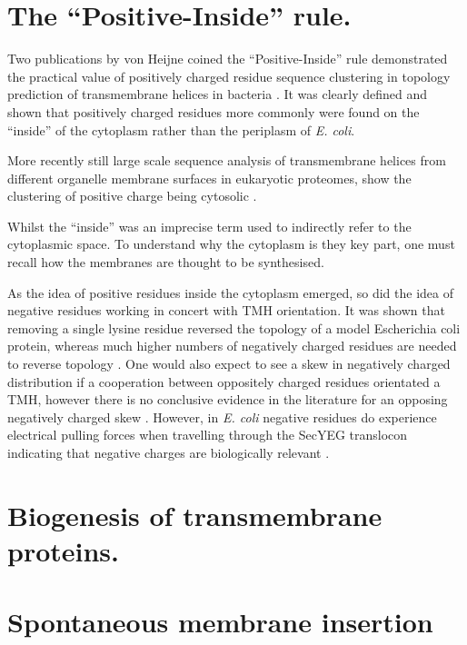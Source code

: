 \documentclass[12pt,PhD,twoside]{muthesis}
\begin{document}
\section{The ``Positive-Inside'' rule.}

Two publications by von Heijne coined the ``Positive-Inside'' rule demonstrated the practical value of positively charged residue sequence clustering in topology prediction of transmembrane helices in bacteria \cite{VonHeijne1989,VonHeijne1992}. It was clearly defined and shown that positively charged residues more commonly were found on the ``inside'' of the cytoplasm rather than the periplasm of {\it E. coli}.

More recently still large scale sequence analysis of transmembrane helices from different organelle membrane surfaces in eukaryotic proteomes, show the clustering of positive charge being cytosolic \cite{Sharpe2010, Baeza-Delgado2013}.

Whilst the ``inside'' was an imprecise term used to indirectly refer to the cytoplasmic space. To understand why the cytoplasm is they key part, one must recall how the membranes are thought to be synthesised.


As the idea of positive residues inside the cytoplasm emerged, so did the idea of negative residues working in concert with TMH orientation. It was shown that removing a single lysine residue reversed the topology of a model Escherichia coli protein, whereas much higher numbers of negatively charged residues are needed to reverse topology \cite{Nilsson1990}. One would also expect to see a skew in negatively charged distribution if a cooperation between oppositely charged residues orientated a TMH, however there is no conclusive evidence in the literature for an opposing negatively charged skew \cite{Granseth2005, Nilsson2005, Sharpe2010, Baeza-Delgado2013}. However, in {\it E. coli} negative residues do experience electrical pulling forces when travelling through the SecYEG translocon indicating that negative charges are biologically relevant \cite{Ismail2015}.

\section{Biogenesis of transmembrane proteins.}

\section{Spontaneous membrane insertion}
\end{document}

